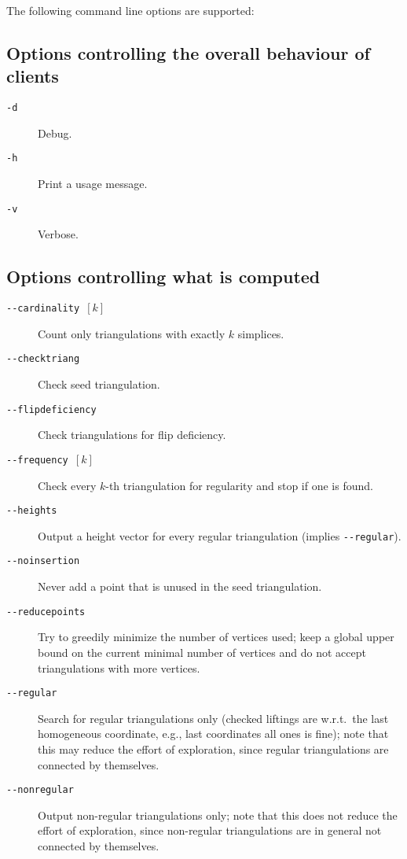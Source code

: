\documentclass[12pt,a4paper]{article}
\begin{document}
The following command line options are supported:

\subsection*{Options controlling the overall behaviour of clients}
\begin{description}
\item[\texttt{-d}] Debug.
\item[\texttt{-h}] Print a usage message.
\item[\texttt{-v}] Verbose.
\end{description}

\subsection*{Options controlling what is computed}
\begin{description}
\item[\texttt{-}\texttt{-cardinality $[k]$}] Count only triangulations with exactly $k$ simplices.
\item[\texttt{-}\texttt{-checktriang}] Check seed triangulation.
\item[\texttt{-}\texttt{-flipdeficiency}] Check triangulations for flip deficiency.
\item[\texttt{-}\texttt{-frequency $[k]$}] Check every $k$-th triangulation
  for regularity and stop if one is found.
\item[\texttt{-}\texttt{-heights}] Output a height vector for every regular triangulation (implies
  \texttt{-}\texttt{-regular}).
\item[\texttt{-}\texttt{-noinsertion}] Never add a point that is unused in the seed triangulation.
\item[\texttt{-}\texttt{-reducepoints}] Try to greedily minimize the number of vertices used; keep
  a global upper bound on the current minimal number of vertices and do not
  accept triangulations with more vertices.
\item[\texttt{-}\texttt{-regular}] Search for regular triangulations only (checked liftings are
  w.r.t.\ the last homogeneous coordinate, e.g., last coordinates all ones is
  fine); note that this may reduce the effort of exploration, since regular
  triangulations are connected by themselves.
\item[\texttt{-}\texttt{-nonregular}] Output non-regular triangulations only;
  note that this does not reduce the effort of exploration, since non-regular
  triangulations are in general not connected by themselves.
\end{description}
\end{document}
